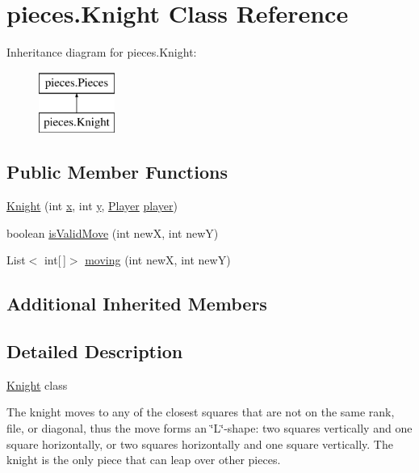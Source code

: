 \hypertarget{classpieces_1_1_knight}{}\section{pieces.\+Knight Class Reference}
\label{classpieces_1_1_knight}
Inheritance diagram for pieces.\+Knight\+:\begin{figure}[H]
\begin{center}
\leavevmode
\includegraphics[height=2.000000cm]{classpieces_1_1_knight}
\end{center}
\end{figure}
\subsection*{Public Member Functions}
\begin{DoxyCompactItemize}
\item 
\mbox{\hyperlink{classpieces_1_1_knight_a90125366cf56f2bda5c94e75d68c6f07}{Knight}} (int \mbox{\hyperlink{classpieces_1_1_pieces_ac5178f9b8a6b0c4235851475081249f3}{x}}, int \mbox{\hyperlink{classpieces_1_1_pieces_a66d911734967a8ced1b9792fe900fadb}{y}}, \mbox{\hyperlink{classgame_1_1_player}{Player}} \mbox{\hyperlink{classpieces_1_1_pieces_a49f35044dd36e5c4b04261a8ea54ad0c}{player}})
\item 
boolean \mbox{\hyperlink{classpieces_1_1_knight_a3c379a4a0fe48e0f066de58a9b2b236d}{is\+Valid\+Move}} (int newX, int newY)
\item 
List$<$ int\mbox{[}$\,$\mbox{]}$>$ \mbox{\hyperlink{classpieces_1_1_knight_ab70ead116fdcb7786b07b671639b792e}{moving}} (int newX, int newY)
\end{DoxyCompactItemize}
\subsection*{Additional Inherited Members}


\subsection{Detailed Description}
\mbox{\hyperlink{classpieces_1_1_knight}{Knight}} class 

The knight moves to any of the closest squares that are not on the same rank, file, or diagonal, thus the move forms an \char`\"{}\+L\char`\"{}-\/shape\+: two squares vertically and one square horizontally, or two squares horizontally and one square vertically. The knight is the only piece that can leap over other pieces. 

